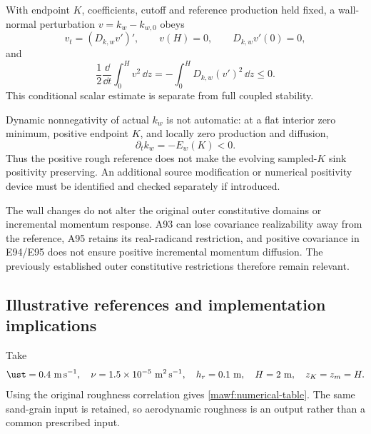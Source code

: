 With endpoint \(K\), coefficients, cutoff and reference production
held fixed, a wall-normal perturbation \(v=k_w-k_{w,0}\) obeys
\[
 v_t=(D_{k,w}v')',\qquad v(H)=0,\qquad D_{k,w}v'(0)=0,
\]
and
\begin{equation}
 \frac12\frac{\dd}{\dd t}\int_0^H v^2\,\dd z
 =-\int_0^H D_{k,w}(v')^2\,\dd z\le0.
 \label{mawf:scalar-stability}
\end{equation}
This conditional scalar estimate is separate from full coupled
stability.

Dynamic nonnegativity of actual \(k_w\) is not automatic:
at a flat interior zero minimum, positive endpoint \(K\), and
locally zero production and diffusion,
\[
 \partial_t k_w=-E_w(K)<0.
\]
Thus the positive rough reference does not make the evolving
sampled-\(K\) sink positivity preserving. An additional source
modification or numerical positivity device must be identified
and checked separately if introduced.

The wall changes do not alter the original outer constitutive
domains or incremental momentum response. A93 can lose covariance
realizability away from the reference, A95 retains its real-radicand
restriction, and positive covariance in E94/E95 does not ensure
positive incremental momentum diffusion. The previously established
outer constitutive restrictions therefore remain relevant.

\subsection{Illustrative references and implementation implications}
\label{mawf:verification}
Take
\begin{equation}
 \ust=0.4\ \mathrm{m\,s^{-1}},\quad
 \nu=1.5\times10^{-5}\ \mathrm{m^2\,s^{-1}},\quad
 h_r=0.1\ \mathrm m,\quad H=2\ \mathrm m,\quad z_K=z_m=H.
 \label{mawf:inputs}
\end{equation}
Using the original roughness correlation gives
\cref{mawf:numerical-table}. The same sand-grain input is retained,
so aerodynamic roughness is an output rather than a common
prescribed input.

